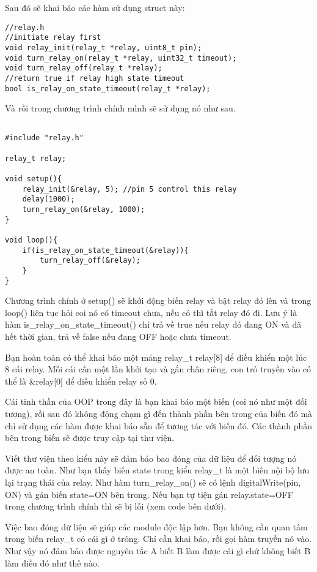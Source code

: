 Sau đó sẽ khai báo các hàm sử dụng struct này:
\begin{lstlisting}
//relay.h
//initiate relay first
void relay_init(relay_t *relay, uint8_t pin);
void turn_relay_on(relay_t *relay, uint32_t timeout);
void turn_relay_off(relay_t *relay);
//return true if relay high state timeout
bool is_relay_on_state_timeout(relay_t *relay);
\end{lstlisting}

Và rồi trong chương trình chính mình sẽ sử dụng nó như sau.
\begin{lstlisting}

#include "relay.h"

relay_t relay;

void setup(){
	relay_init(&relay, 5); //pin 5 control this relay
	delay(1000);
	turn_relay_on(&relay, 1000);
}

void loop(){
	if(is_relay_on_state_timeout(&relay)){
		turn_relay_off(&relay);
	}
}

\end{lstlisting}

Chương trình chính ở setup() sẽ khởi động biến relay và bật relay đó lên và trong loop() liên tục hỏi coi nó có timeout chưa, nếu có thì tắt relay đó đi. Lưu ý là hàm is\_relay\_on\_state\_timeout() chỉ trả về true nếu relay đó đang ON và đã hết thời gian, trả về false nếu đang OFF hoặc chưa timeout.

Bạn hoàn toàn có thể khai báo một mảng relay\_t relay[8] để điều khiển một lúc 8 cái relay. Mỗi cái cần một lần khởi tạo và gắn chân riêng, con trỏ truyền vào có thể là \&relay[0] để điều khiển relay số 0.

Cái tinh thần của OOP trong đây là bạn khai báo một biến (coi nó như một đối tượng), rồi sau đó không động chạm gì đến thành phần bên trong của biến đó mà chỉ sử dụng các hàm được khai báo sẵn để tương tác với biến đó. Các thành phần bên trong biến sẽ được truy cập tại thư viện. 

Viết thư viện theo kiểu này sẽ đảm bảo bao đóng của dữ liệu để đối tượng nó được an toàn. Như bạn thấy biến state trong kiểu relay\_t là một biến nội bộ lưu lại trạng thái của relay. Như hàm turn\_relay\_on() sẽ có lệnh digitalWrite(pin, ON) và gán biến state=ON bên trong. Nếu bạn tự tiện gán relay.state=OFF trong chương trình chính thì sẽ bị lỗi (xem code bên dưới).

Việc bao đóng dữ liệu sẽ giúp các module độc lập hơn. Bạn không cần quan tâm trong biến relay\_t có cái gì ở trỏng. Chỉ cần khai báo, rồi gọi hàm truyền nó vào. Như vậy nó đảm bảo được nguyên tắc A biết B làm được cái gì chứ không biết B làm điều đó như thế nào.


